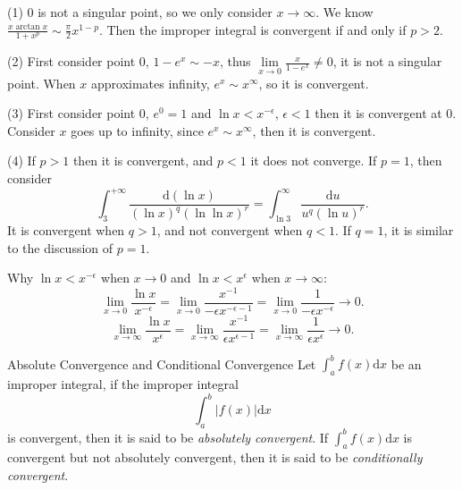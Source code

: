 \begin{solution}
  (1) $0$ is not a singular point, so we only consider $x \rightarrow \infty$.
  We know $\frac{x \arctan x}{1 + x^p} \sim \frac{\pi}{2} x^{1-p}$.
  Then the improper integral is convergent if and only if $p > 2$.

  (2) First consider point $0$, $1-e^x \sim -x$, thus $\lim \limits _{x
  \rightarrow 0} \frac{x}{1-e^x} \neq 0$, it is not a singular point.
  When $x$ approximates infinity, $e^x \sim x^{\infty}$, so it is convergent.

  (3) First consider point $0$, $e^0 = 1$ and $\ln x < x^{-\epsilon}$,
  $\epsilon < 1$ then it is convergent at $0$.
  Consider $x$ goes up to infinity, since $e^x \sim x^{\infty}$,
  then it is convergent.

  (4) If $p > 1$ then it is convergent, and $p<1$ it does not converge.
  If $p = 1$, then consider
  \begin{equation}
    \int_3^{+\infty} \frac{\mathrm{d} (\ln x)}{(\ln x)^q (\ln \ln x)^r}
    = \int_{\ln 3}^{\infty} \frac{\mathrm{d} u}{u^q (\ln u)^r}.
  \end{equation}
  It is convergent when $q > 1$, and not convergent when $q < 1$.
  If $q = 1$, it is similar to the discussion of $p = 1$.
\end{solution}

\begin{note}
  Why $\ln x < x^{-\epsilon}$ when $x \rightarrow 0$
  and $\ln x < x^{\epsilon}$ when $x \rightarrow \infty$:
  \begin{equation}
    \lim \limits _{x \rightarrow 0} \frac{\ln x}{x^{-\epsilon}}
    = \lim \limits _{x \rightarrow 0} \frac{x^{-1}}{-\epsilon x^{-\epsilon - 1}}
    = \lim \limits _{x \rightarrow 0} \frac{1}{-\epsilon x^{-\epsilon}} \rightarrow 0.
  \end{equation}
  \begin{equation}
    \lim \limits _{x \rightarrow \infty} \frac{\ln x}{x^{\epsilon}}
    = \lim \limits _{x \rightarrow \infty} \frac{x^{-1}}{\epsilon x^{\epsilon - 1}}
    = \lim \limits _{x \rightarrow \infty} \frac{1}{\epsilon x^{\epsilon}} \rightarrow 0.
  \end{equation}
\end{note}

\begin{definition}{Absolute Convergence and Conditional Convergence}{}
  Let $\int_a^bf(x)\mathrm{d}x$ be an improper integral,
  if the improper integral
  \begin{equation}
    \int_a^b |f(x)|\mathrm{d}x
  \end{equation}
  is convergent, then it is said to be \emph{absolutely convergent}.
  If $\int_a^bf(x)\mathrm{d}x$ is convergent but not absolutely convergent,
  then it is said to be \emph{conditionally convergent}.
\end{definition}

